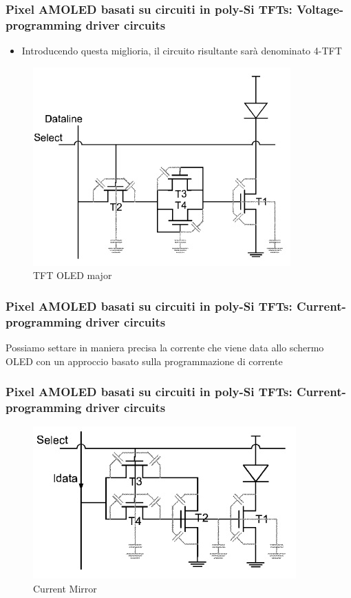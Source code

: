 \documentclass[12pt]{beamer}
\begin{document}
	\begin{frame}
		\frametitle{Pixel AMOLED basati su circuiti in poly-Si TFTs: Voltage-programming driver circuits}
		\begin{itemize}
			\item Introducendo questa miglioria, il circuito risultante sarà denominato 4-TFT
		\end{itemize}
		\pause
		\begin{figure}
			\centering
			\includegraphics[width=0.7\linewidth]{FISICA/tft_oled_maggiore}
			\caption{TFT OLED major}
			\label{fig:tftoledmaggiore}
		\end{figure}
	\end{frame}
	\begin{frame}
		\frametitle{Pixel AMOLED basati su circuiti in poly-Si TFTs: Current-programming driver circuits}
		Possiamo settare in maniera precisa la corrente che viene data allo schermo OLED con un approccio basato sulla programmazione di corrente
	\end{frame}
	\begin{frame}
		\frametitle{Pixel AMOLED basati su circuiti in poly-Si TFTs: Current-programming driver circuits}
		\begin{figure}
			\centering
			\includegraphics[width=1\linewidth]{FISICA/current_mirror}
			\caption{Current Mirror}
			\label{fig:currentmirror}
		\end{figure}
	\end{frame}
\end{document}
